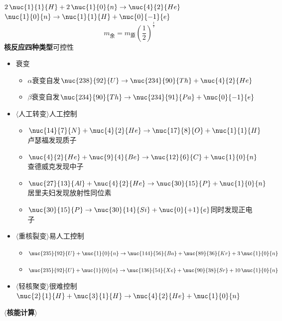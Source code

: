 \noindent $2\,\nuc{1}{1}{H}+2\,\nuc{1}{0}{n}\to\nuc{4}{2}{He}$\qquad $\nuc{1}{0}{n}\to\nuc{1}{1}{H}+\nuc{0}{-1}{e}$ %
\[
m_{\text{余}}=m_{\text{原}}\left(\frac12\right)^{\frac{t}{\tau}}
\] %
\textbf{核反应四种类型}\quad 可控性 %
\begin{itemize}
\item 衰变
  \begin{itemize}
  \item $\alpha$衰变\quad 自发\quad $\nuc{238}{92}{U}\to\nuc{234}{90}{Th}+\nuc{4}{2}{He}$
  \item $\beta$衰变\quad 自发\quad $\nuc{234}{90}{Th}\to\nuc{234}{91}{Pa}+\nuc{0}{-1}{e}$
  \end{itemize}
\item $\langle$人工转变$\rangle$\quad 人工控制
  \begin{itemize}
  \item $\nuc{14}{7}{N}+\nuc{4}{2}{He}\to\nuc{17}{8}{O}+\nuc{1}{1}{H}$\quad 卢瑟福发现质子
  \item $\nuc{4}{2}{He}+\nuc{9}{4}{Be}\to\nuc{12}{6}{C}+\nuc{1}{0}{n}$\quad 查德威克发现中子
  \item $\nuc{27}{13}{Al}+\nuc{4}{2}{He}\to\nuc{30}{15}{P}+\nuc{1}{0}{n}$\quad 居里夫妇发现放射性同位素
  \item $\nuc{30}{15}{P}\to\nuc{30}{14}{Si}+\nuc{0}{+1}{e}$\quad 同时发现正电子
  \end{itemize}
\item $\langle$重核裂变$\rangle$\quad 易人工控制
  \begin{itemize}
  \item $\nuc{235}{92}{U}+\nuc{1}{0}{n}\to\nuc{144}{56}{Ba}+\nuc{89}{36}{Kr}+3\,\nuc{1}{0}{n}$
  \item $\nuc{235}{92}{U}+\nuc{1}{0}{n}\to\nuc{136}{54}{Xe}+\nuc{90}{38}{Sr}+10\,\nuc{1}{0}{n}$
  \end{itemize}
\item $\langle$轻核聚变$\rangle$\quad 很难控制\quad $\nuc{2}{1}{H}+\nuc{3}{1}{H}\to\nuc{4}{2}{He}+\nuc{1}{0}{n}$
\end{itemize}
\textbf{$\langle$核能计算$\rangle$} %

